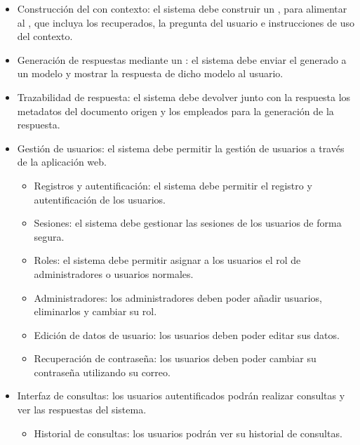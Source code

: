 \begin{itemize}
\begin{itemize}
	\tightlist
		\item {} Generación de : el sistema debe generar el  de la consulta del usuario.
		\item {} Búsqueda por similitud: el sistema debe realizar una búsqueda por similitud en la base de datos vectorial.
	\end{itemize}
	\item {} Construcción del  con contexto: el sistema debe construir un , para alimentar al , que incluya los  recuperados, la pregunta del usuario e instrucciones de uso del contexto.
	\item {} Generación de respuestas mediante un : el sistema debe enviar el  generado a un modelo  y mostrar la respuesta de dicho modelo al usuario.
	\item {} Trazabilidad de respuesta: el sistema debe devolver junto con la respuesta los metadatos del documento origen y los  empleados para la generación de la respuesta. 
	\item {} Gestión de usuarios: el sistema debe permitir la gestión de usuarios a través de la aplicación web.
	\begin{itemize}
	\tightlist
		\item {} Registros y autentificación: el sistema debe permitir el registro y autentificación de los usuarios.
		\item {} Sesiones: el sistema debe gestionar las sesiones de los usuarios de forma segura.
		\item {} Roles: el sistema debe permitir asignar a los usuarios el rol de administradores o usuarios normales.
		\item {} Administradores: los administradores deben poder añadir usuarios, eliminarlos y cambiar su rol.
		\item {} Edición de datos de usuario: los usuarios deben poder editar sus datos.
		\item {} Recuperación de contraseña: los usuarios deben poder cambiar su contraseña utilizando su correo.
	\end{itemize}
	\item {} Interfaz de consultas: los usuarios autentificados podrán realizar consultas y ver las respuestas del sistema.
	\begin{itemize}
	\tightlist
		\item {} Historial de consultas: los usuarios podrán ver su historial de consultas.

\end{itemize}
\end{itemize}

